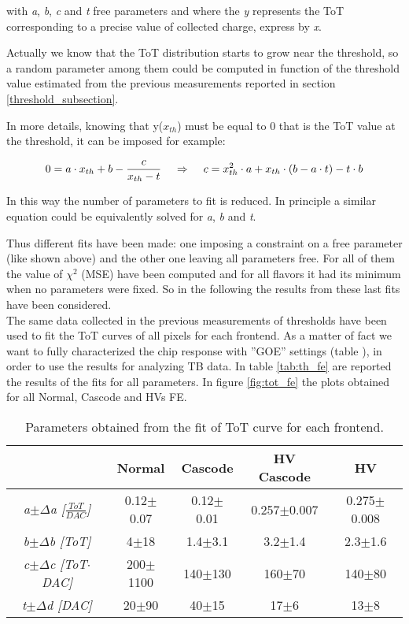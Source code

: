 with \textit{a}, \textit{b}, \textit{c} and \textit{t} free parameters and where the \textit{y} represents the ToT corresponding to a precise value of collected charge, express by \textit{x}. 

Actually we know that the ToT distribution starts to grow near the threshold, so a random parameter among them could be computed in function of the threshold value estimated from the previous measurements reported in section \ref{threshold_subsection}.

In more details, knowing that y($x_{th}$) must be equal to 0 that is the ToT value at the threshold, it can be imposed for example:

\begin{equation}
0 = a\cdot x_{th} + b - \frac{c}{x_{th}-t}  \hspace{.4cm}	\Rightarrow  \hspace{.4cm}	c = x_{th}^{2}\cdot a + x_{th}\cdot (b-a\cdot t) - t\cdot b
\end{equation}

In this way the number of parameters to fit is reduced. In principle a similar equation could be equivalently solved for \textit{a}, \textit{b} and \textit{t}. 


Thus different fits have been made: one imposing a constraint on a free parameter (like shown above) and the other one leaving all parameters free. For all of them the value of $\chi^{2}$ (MSE) have been computed and for all flavors it had its minimum when no parameters were fixed. So in the following the results from these last fits have been considered.\\

The same data collected in the previous measurements of thresholds have been used to fit the ToT curves of all pixels for each frontend. As a matter of fact we want to fully characterized the chip response with ''GOE'' settings (table ), in order to use the results for analyzing TB data.
In table \vref{tab:th_fe} are reported the results of the fits for all parameters. In figure \vref{fig:tot_fe} the plots obtained for all Normal, Cascode and HVs FE.

\begin{table}[h!]
\centering
\begin{tabular}{c|c|c|c|c}
 & \textbf{Normal} & \textbf{Cascode} & \textbf{HV Cascode} & \textbf{HV} \\
\hline
\textit{a$\pm\Delta$a [$\frac{ToT}{DAC}$]} & 0.12$\pm$0.07 & 0.12$\pm$0.01 & 0.257$\pm$0.007 & 0.275$\pm$0.008 \\
\textit{b$\pm\Delta$b [ToT]} & 4$\pm$18 & 1.4$\pm$3.1 & 3.2$\pm$1.4 & 2.3$\pm$1.6 \\
\textit{c$\pm\Delta$c [ToT$\cdot$DAC]} & 200$\pm$1100 & 140$\pm$130 & 160$\pm$70 & 140$\pm$80 \\
\textit{t$\pm\Delta$d [DAC]} & 20$\pm$90 & 40$\pm$15 & 17$\pm$6 & 13$\pm$8 \\
\end{tabular}
\caption{Parameters obtained from the fit of ToT curve for each frontend.}
\label{tab:th_fe}
\end{table}

